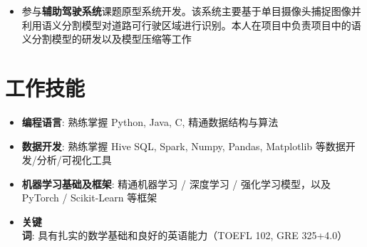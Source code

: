 \documentclass{resume}
\begin{document}
\begin{itemize}
  \item 参与\textbf{辅助驾驶系统}课题原型系统开发。该系统主要基于单目摄像头捕捉图像并利用语义分割模型对道路可行驶区域进行识别。本人在项目中负责项目中的语义分割模型的研发以及模型压缩等工作
\end{itemize}

\section{\color{darkgray} 工作技能}
\begin{itemize}[parsep=0.2ex]
  \item \textbf{编程语言}: 熟练掌握 Python, Java, C, 精通数据结构与算法
  \item \textbf{数据开发}: 熟练掌握 Hive SQL, Spark, Numpy, Pandas, Matplotlib 等数据开发/分析/可视化工具
  \item \textbf{机器学习基础及框架}: 精通机器学习 / 深度学习 / 强化学习模型，以及 PyTorch / Scikit-Learn 等框架
  \item \textbf{关键词}: 具有扎实的数学基础和良好的英语能力（TOEFL 102, GRE 325+4.0）
\end{itemize}


\end{document}
